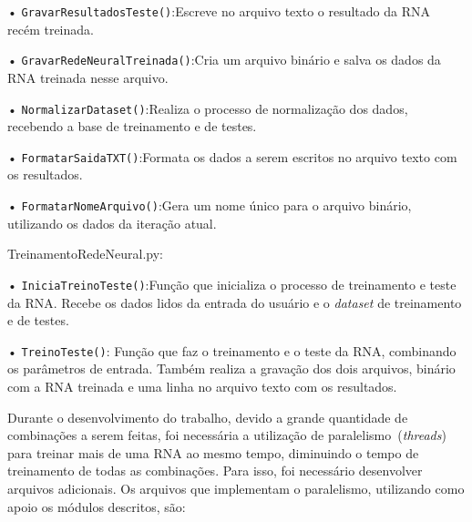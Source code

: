\documentclass[12pt,oneside,a4paper,chapter=TITLE,section=TITLE,sumario
		=tradicional]{abntex2}
\begin{document}
\begin{lista}
\begin{lista}
				\item[•] \texttt{GravarResultadosTeste()}:\hspace{0.1cm}Escreve no arquivo texto o resultado da RNA recém treinada.
				
				\item[•] \texttt{GravarRedeNeuralTreinada()}:\hspace{0.1cm}Cria um arquivo binário e salva os dados da RNA treinada nesse arquivo.  
				
				\item[•] \texttt{NormalizarDataset()}:\hspace{0.1cm}Realiza o processo de normalização dos dados, recebendo a base de treinamento e de testes.
				
				\item[•] \texttt{FormatarSaidaTXT()}:\hspace{0.1cm}Formata os dados a serem escritos no arquivo texto com os resultados.
				
				\item[•] \texttt{FormatarNomeArquivo()}:\hspace{0.1cm}Gera um nome único para o arquivo binário, utilizando os dados da iteração atual.
			\end{lista}
			
			\item TreinamentoRedeNeural.py:
			\begin{lista}
				\item[•] \texttt{IniciaTreinoTeste()}:\hspace{0.1cm}Função que inicializa o processo de treinamento e teste da RNA. Recebe os dados lidos da entrada do usuário e o \textit{dataset} de treinamento e de testes.
				
				\item[•] \texttt{TreinoTeste()}: Função que faz o treinamento e o teste da RNA, combinando os parâmetros de entrada. Também realiza a gravação dos dois arquivos, binário com a RNA treinada e uma linha no arquivo texto com os resultados.
			\end{lista}
		\end{lista}
		
		Durante o desenvolvimento do trabalho, devido a grande quantidade de combinações a serem feitas, foi necessária a utilização de paralelismo~(\textit{threads}) para treinar mais de uma RNA ao mesmo tempo, diminuindo o tempo de treinamento de todas as combinações. Para isso, foi necessário desenvolver arquivos adicionais. Os arquivos que implementam o paralelismo, utilizando como apoio os módulos descritos, são:
		
\end{document}

